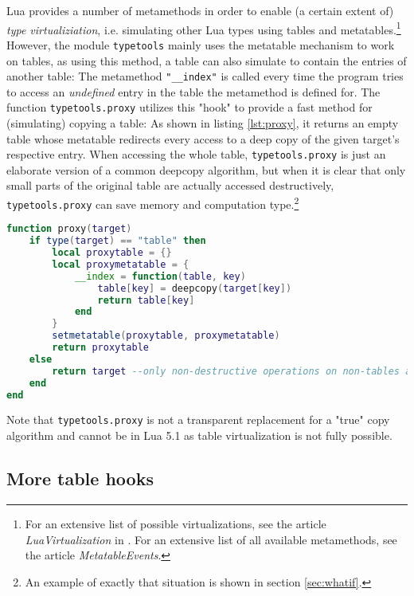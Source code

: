 Lua provides a number of metamethods in order to enable (a certain extent of) \emph{type virtualiziation}, i.e. simulating other Lua types using tables and metatables.\footnote{For an extensive list of possible virtualizations, see the article \emph{LuaVirtualization} in \cite{LuaUsersWiki}. For an extensive list of all available metamethods, see the article \emph{MetatableEvents}.} However, the module \texttt{typetools} mainly uses the metatable mechanism to work on tables, as using this method, a table can also simulate to contain the entries of another table: The metamethod \texttt{"\_\_index"} is called every time the program tries to access an \emph{undefined} entry in the table the metamethod is defined for. The function \texttt{typetools.proxy} utilizes this "hook" to provide a fast method for (simulating) copying a table: As shown in listing \ref{lst:proxy}, it returns an empty table whose metatable redirects every access to a deep copy of the given target's respective entry. When accessing the whole table, \texttt{typetools.proxy} is just an elaborate version of a common deepcopy algorithm, but when it is clear that only small parts of the original table are actually accessed destructively, \texttt{typetools.proxy} can save memory and computation type.\footnote{An example of exactly that situation is shown in section \ref{sec:whatif}.}

\begin{lstlisting}[language=lua, caption={The function \texttt{typetools.proxy}}, label=lst:proxy, name=lst:proxy]
function proxy(target)
	if type(target) == "table" then
		local proxytable = {}
		local proxymetatable = {
			__index = function(table, key)
				table[key] = deepcopy(target[key])
				return table[key]
			end
		}
		setmetatable(proxytable, proxymetatable)
		return proxytable
	else
		return target --only non-destructive operations on non-tables anyway
	end
end
\end{lstlisting}

Note that \texttt{typetools.proxy} is not a transparent replacement for a "true" copy algorithm and cannot be in Lua 5.1 as table virtualization is not fully possible.

\subsection{More table hooks}

